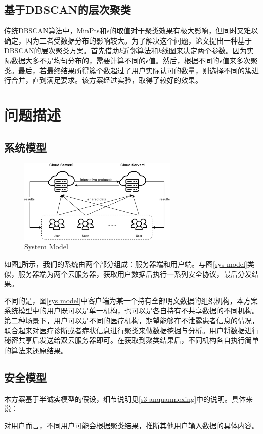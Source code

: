 \subsection{基于DBSCAN的层次聚类}
传统DBSCAN算法中，MinPts和$ \epsilon $的取值对于聚类效果有极大影响，但同时又难以确定，因为二者受数据分布的影响较大。为了解决这个问题，论文\cite{latifi2021dbhc}提出一种基于DBSCAN的层次聚类方案。首先借助$ k $近邻算法和$ k $线图来决定两个参数。因为实际数据大多不是均匀分布的，需要计算不同的$ \epsilon $值。然后，根据不同的$ \epsilon $值来多次聚类。最后，若最终结果所得簇个数超过了用户实际认可的数量，则选择不同的簇进行合并，直到满足要求。该方案经过实验，取得了较好的效果。
\section{问题描述}
\label{s4-wenti}
\subsection{系统模型}
\begin{figure}[htbp]
	\centering
	\includegraphics[width=3in]{img/ch4-sysmod.png}%
	\caption{System Model}
	\label{s4-sysmod}
\end{figure}
如图\ref{s4-sysmod}所示，我们的系统由两个部分组成：服务器端和用户端。与图\ref{sys model}类似，服务器端为两个云服务器，获取用户数据后执行一系列安全协议，最后分发结果。

不同的是，图\ref{sys model}中客户端为某一个持有全部明文数据的组织机构，本方案系统模型中的用户既可以是单一机构，也可以是各自持有不共享数据的不同机构。第二种场景下，用户可以是不同的医疗机构，期望能够在不泄露患者信息的情况，联合起来对医疗诊断或者症状信息进行聚类来做数据挖掘与分析。用户将数据进行秘密共享后发送给双云服务器即可。在获取到聚类结果后，不同机构各自执行简单的算法来还原结果。
\subsection{安全模型}
本方案基于半诚实模型的假设，细节说明见\ref{s3-anquanmoxing}中的说明。具体来说：

对用户而言，不同用户可能会根据聚类结果，推断其他用户输入数据的具体内容。

